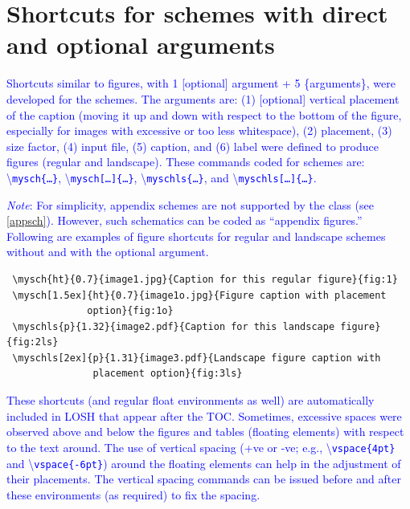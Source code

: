 \documentclass[phd,showgrids]{ndsu-thesis-2022}
\newcommand\italk[1]{\textcolor{blue}{#1}}  %
\newcommand\cmd[1]{\textbackslash\texttt{#1}}  %
\begin{document}
\section{Shortcuts for schemes with direct and optional arguments}

\italk{Shortcuts similar to figures, with 1 [optional] argument + 5 \{arguments\}, were developed for the schemes. The arguments are: (1) [optional] vertical placement of the caption (moving it up and down with respect to the bottom of the figure, especially for images with excessive or too less whitespace), (2) placement, (3) size factor, (4) input file, (5) caption, and (6) label were defined to produce figures (regular and landscape). These commands coded for schemes are: \cmd{mysch\{\ldots\}}, \cmd{mysch[\ldots]\{\ldots\}}, \cmd{myschls\{\ldots\}}, and \cmd{myschls[\ldots]\{\ldots\}}.}

\italk{\emph{Note}: For simplicity, appendix schemes are not supported by the class (see \cref{appsch}). However, such schematics can be coded as ``appendix figures.''  Following are examples of figure shortcuts for regular and landscape schemes without and with the optional argument.}

\begin{flushleft}
\hspace{-0.2cm}
\begin{minipage}{0ex}
\begin{verbatim}
 \mysch{ht}{0.7}{image1.jpg}{Caption for this regular figure}{fig:1}
 \mysch[1.5ex]{ht}{0.7}{image1o.jpg}{Figure caption with placement 
              option}{fig:1o}
 \myschls{p}{1.32}{image2.pdf}{Caption for this landscape figure}{fig:2ls}
 \myschls[2ex]{p}{1.31}{image3.pdf}{Landscape figure caption with 
               placement option}{fig:3ls}
\end{verbatim}
\end{minipage}
\end{flushleft}

\italk{These shortcuts (and regular float environments as well) are automatically included in LOSH that appear after the TOC. Sometimes, excessive spaces were observed above and below the figures and tables (floating elements) with respect to the text around. The use of vertical spacing (+ve or -ve; e.g., \cmd{vspace\{4pt\}} and \cmd{vspace\{-6pt\}}) around the floating elements can help in the adjustment of their placements. The vertical spacing commands can be issued before and after these environments (as required) to fix the spacing. }
\end{document}
